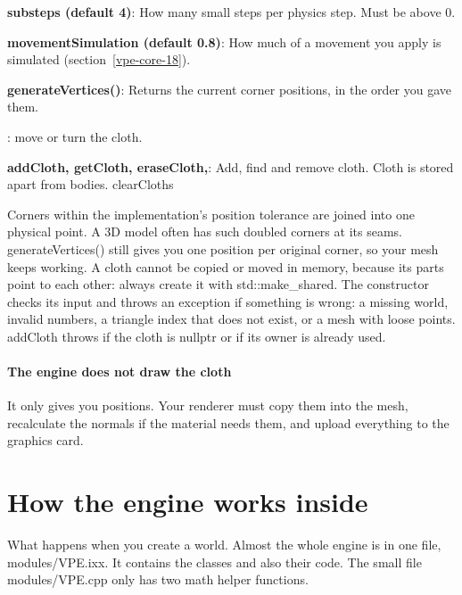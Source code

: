 \documentclass[11pt,a4paper]{article}
\begin{document}
\textbf{substeps (default 4)}: How many small steps per physics step. Must be above 0.

\textbf{movementSimulation (default 0.8)}: How much of a movement you apply is simulated (section~\ref{vpe-core-18}).

\textbf{generateVertices()}: Returns the current corner positions, in the order you gave them.

: move or turn the cloth.

\textbf{addCloth, getCloth, eraseCloth,}: Add, find and remove cloth. Cloth is stored apart from bodies. clearCloths

Corners within the implementation's position tolerance are joined into one physical point. A 3D model often has such doubled corners at its seams. generateVertices() still gives you one position per original corner, so your mesh keeps working. A cloth cannot be copied or moved in memory, because its parts point to each other: always create it with std::make\_shared. The constructor checks its input and throws an exception if something is wrong: a missing world, invalid numbers, a triangle index that does not exist, or a mesh with loose points. addCloth throws if the cloth is nullptr or if its owner is already used.

\subsection*{The engine does not draw the cloth}
It only gives you positions. Your renderer must copy them into the mesh, recalculate the normals if the material needs them, and upload everything to the graphics card.

\clearpage\part{How the engine works inside}
\label{vpe-core-9}
What happens when you create a world. Almost the whole engine is in one file, modules/VPE.ixx. It contains the classes and also their code. The small file modules/VPE.cpp only has two math helper functions.

\begin{center}\end{center}
\end{document}
